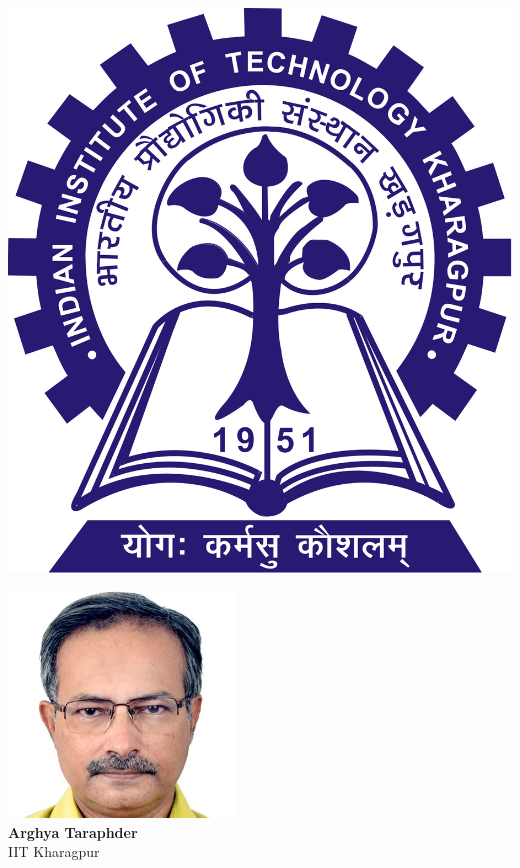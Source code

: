 \documentclass[aspectratio=169]{beamer}
\begin{document}
\begin{frame}{}
\hspace*{\fill}
\begin{minipage}{0.1\textwidth}
	\includegraphics[width=\textwidth]{IITKGP.png}\\
\end{minipage}
\hspace*{\fill}
\begin{minipage}{0.3\textwidth}
	\centering
	\includegraphics[width=0.45\textwidth]{arghya.jpg}\\
	\footnotesize{{\bf Arghya Taraphder}\\
	IIT Kharagpur}
\end{minipage}
\hspace*{\fill}

\end{frame}
\end{document}
